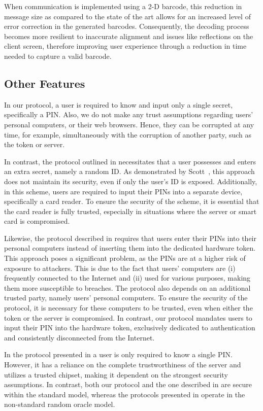 When communication is implemented using a 2-D barcode, this reduction in message size as compared to the state of the art allows for an increased level of error correction in the generated barcodes.
Consequently, the decoding process becomes more resilient to inaccurate alignment and issues like reflections on the client screen, therefore improving user experience through a reduction in time needed to capture a valid barcode.


\subsection{Other Features}


In our protocol, a user is required to know and input only a single secret, specifically a PIN. Also, we do not make any trust assumptions regarding users' personal computers, or their web browsers. Hence, they can be corrupted at any time,  for example, simultaneously with the corruption of another party, such as the token or server. 
 
 In contrast, the protocol outlined in \cite{WangW18} necessitates that a user possesses and enters an extra secret, namely a random ID.  As demonstrated by Scott~\cite{Scott12a}, this approach does not maintain its security, even if only the user's ID is exposed. Additionally, in this scheme, users are required to input their PINs into a separate device, specifically a card reader. To ensure the security of the scheme, it is essential that the card reader is fully trusted, especially in situations where the server or smart card is compromised.
 
 
  Likewise, the protocol described in  \cite{JareckiJKSS21} requires that users enter their PINs into their personal computers instead of inserting them into the dedicated hardware token. This approach poses a significant problem, as the PINs are at a higher risk of exposure to attackers. This is due to the fact that users' computers are (i) frequently connected to the Internet and (ii) used for various purposes, making them more susceptible to breaches.
The protocol also depends on an additional trusted party, namely users' personal computers. To ensure the security of the protocol, it is necessary for these computers to be trusted, even when either the token or the server is compromised. In contrast, our protocol mandates users to input their PIN into the hardware token, exclusively dedicated to authentication and consistently disconnected from the Internet. 
 
 
 In the protocol presented in \cite{MatsuoMY11} a user is only required to know a single PIN. However, it has a reliance on the complete trustworthiness of the server and utilizes a trusted chipset, making it dependent on the strongest security assumptions. In contrast, both our protocol and the one described in \cite{MatsuoMY11} are secure within the standard model, whereas the protocols presented in \cite{WangW18,JareckiJKSS21} operate in the non-standard random oracle model. 




